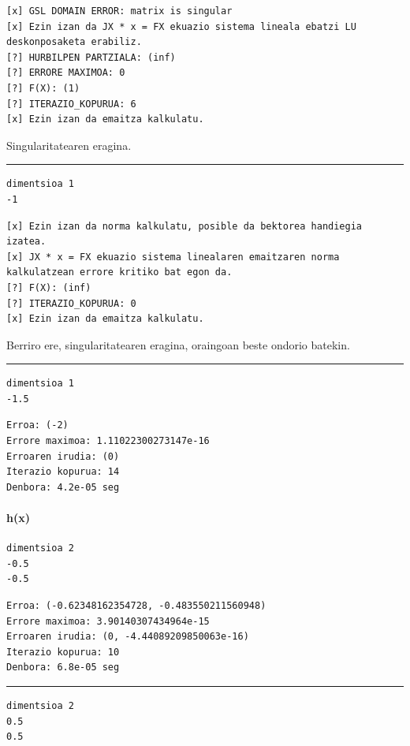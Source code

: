 \documentclass[10pt,a4paper,basque]{article}
\begin{document}
\begin{lstlisting}
[x] GSL DOMAIN ERROR: matrix is singular
[x] Ezin izan da JX * x = FX ekuazio sistema lineala ebatzi LU deskonposaketa erabiliz.
[?] HURBILPEN PARTZIALA: (inf)
[?] ERRORE MAXIMOA: 0
[?] F(X): (1)
[?] ITERAZIO_KOPURUA: 6
[x] Ezin izan da emaitza kalkulatu.
\end{lstlisting}

Singularitatearen eragina.

\rule{12cm}{0.4pt}

\begin{lstlisting}
dimentsioa 1
-1
\end{lstlisting}

\begin{lstlisting}
[x] Ezin izan da norma kalkulatu, posible da bektorea handiegia izatea.
[x] JX * x = FX ekuazio sistema linealaren emaitzaren norma kalkulatzean errore kritiko bat egon da.
[?] F(X): (inf)
[?] ITERAZIO_KOPURUA: 0
[x] Ezin izan da emaitza kalkulatu.
\end{lstlisting}

Berriro ere, singularitatearen eragina, oraingoan beste ondorio batekin.

\rule{12cm}{0.4pt}

\begin{lstlisting}
dimentsioa 1
-1.5
\end{lstlisting}

\begin{lstlisting}
Erroa: (-2)
Errore maximoa: 1.11022300273147e-16
Erroaren irudia: (0)
Iterazio kopurua: 14
Denbora: 4.2e-05 seg
\end{lstlisting}

\paragraph{h(x)}

\begin{lstlisting}
dimentsioa 2
-0.5
-0.5
\end{lstlisting}

\begin{lstlisting}
Erroa: (-0.62348162354728, -0.483550211560948)
Errore maximoa: 3.90140307434964e-15
Erroaren irudia: (0, -4.44089209850063e-16)
Iterazio kopurua: 10
Denbora: 6.8e-05 seg
\end{lstlisting}

\rule{12cm}{0.4pt}

\begin{lstlisting}
dimentsioa 2
0.5
0.5
\end{lstlisting}
\end{document}
